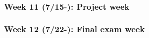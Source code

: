 \subsubsection{Week 11 (7/15-): Project week} %
\subsubsection{Week 12 (7/22-): Final exam week}%


